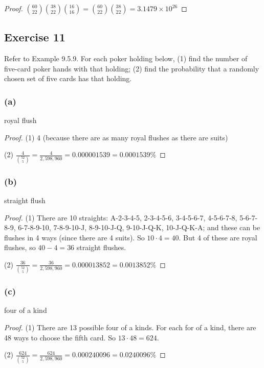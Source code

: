 \documentclass[14pt]{extarticle}
\newcommand{\dps}{\displaystyle}
\begin{document}
\begin{proof}
\(\binom{60}{22}\binom{38}{22}\binom{16}{16} = \binom{60}{22}\binom{38}{22} = 3.1479 \times 10^{26}\)
\end{proof}

\subsection{Exercise 11}
Refer to Example 9.5.9. For each poker holding below, (1) find the number of five-card poker hands with that holding; 
(2) find the probability that a randomly chosen set of five cards has that holding.

\subsubsection{(a)}
royal flush

\begin{proof}
(1) 4 (because there are as many royal flushes as there are suits)

(2) \(\dps \frac{4}{\binom{52}{5}} = \frac{4}{2,598,960} = 0.000001539 = 0.0001539\%\)
\end{proof}

\subsubsection{(b)}
straight flush

\begin{proof}
(1) There are 10 straights: A-2-3-4-5, 2-3-4-5-6, 3-4-5-6-7, 4-5-6-7-8, 5-6-7-8-9, 6-7-8-9-10, 7-8-9-10-J, 8-9-10-J-Q, 
9-10-J-Q-K, 10-J-Q-K-A; and these can be flushes in 4 ways (since there are 4 suits). So \(10 \cdot 4 = 40\). But 4 of
these are royal flushes, so \(40 - 4 = 36\) straight flushes.

(2) \(\dps \frac{36}{\binom{52}{5}} = \frac{36}{2,598,960} = 0.000013852 = 0.0013852\%\)
\end{proof}

\subsubsection{(c)}
four of a kind

\begin{proof}
(1) There are 13 possible four of a kinds. For each for of a kind, there are 48 ways to choose the fifth card. 
So \(13 \cdot 48 = 624\).

(2) \(\dps \frac{624}{\binom{52}{5}} = \frac{624}{2,598,960} = 0.000240096 = 0.0240096\%\)
\end{proof}
\end{document}
